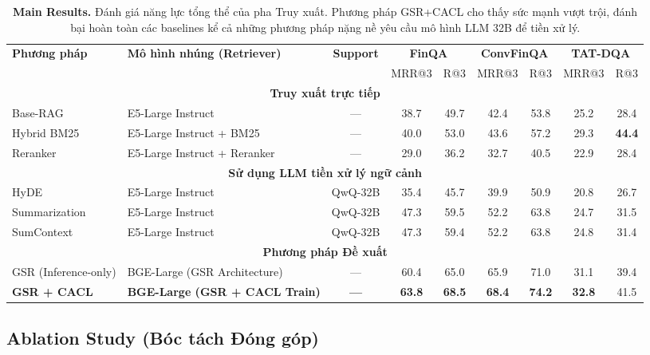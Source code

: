\documentclass[10pt, a4paper]{article}
\begin{document}
\begin{table}[h]
\centering
\small\setlength{\tabcolsep}{4pt}
\begin{tabular}{ll|c|cc|cc|cc}
\toprule
\multirow{2}{*}{\textbf{Phương pháp}} & \multirow{2}{*}{\textbf{Mô hình nhúng (Retriever)}} & \textbf{Support} & \multicolumn{2}{c|}{\textbf{FinQA}} & \multicolumn{2}{c|}{\textbf{ConvFinQA}} & \multicolumn{2}{c}{\textbf{TAT-DQA}} \\
 & & \textbf{} & MRR@3 & R@3 & MRR@3 & R@3 & MRR@3 & R@3 \\
\midrule
\multicolumn{9}{c}{\textbf{Truy xuất trực tiếp}} \\
\midrule
Base-RAG & E5-Large Instruct & --- & 38.7 & 49.7 & 42.4 & 53.8 & 25.2 & 28.4 \\
Hybrid BM25 & E5-Large Instruct + BM25 & --- & 40.0 & 53.0 & 43.6 & 57.2 & 29.3 & \textbf{44.4} \\
Reranker & E5-Large Instruct + Reranker & --- & 29.0 & 36.2 & 32.7 & 40.5 & 22.9 & 28.4 \\
\midrule
\multicolumn{9}{c}{\textbf{Sử dụng LLM tiền xử lý ngữ cảnh}} \\
\midrule
HyDE & E5-Large Instruct & QwQ-32B & 35.4 & 45.7 & 39.9 & 50.9 & 20.8 & 26.7 \\
Summarization & E5-Large Instruct & QwQ-32B & 47.3 & 59.5 & 52.2 & 63.8 & 24.7 & 31.5 \\
SumContext & E5-Large Instruct & QwQ-32B & 47.3 & 59.4 & 52.2 & 63.8 & 24.8 & 31.4 \\
\midrule
\multicolumn{9}{c}{\textbf{Phương pháp Đề xuất}} \\
\midrule
GSR (Inference-only) & BGE-Large (GSR Architecture) & --- & 60.4 & 65.0 & 65.9 & 71.0 & 31.1 & 39.4 \\
\textbf{GSR + CACL} & \textbf{BGE-Large (GSR + CACL Train)} & \textbf{---} & \textbf{63.8} & \textbf{68.5} & \textbf{68.4} & \textbf{74.2} & \textbf{32.8} & 41.5 \\
\bottomrule
\end{tabular}
\caption{\textbf{Main Results.} Đánh giá năng lực tổng thể của pha Truy xuất. Phương pháp GSR+CACL cho thấy sức mạnh vượt trội, đánh bại hoàn toàn các baselines kể cả những phương pháp nặng nề yêu cầu mô hình LLM 32B để tiền xử lý.}
\label{tab:main}
\end{table}

\subsection{Ablation Study (Bóc tách Đóng góp)}
\end{document}
